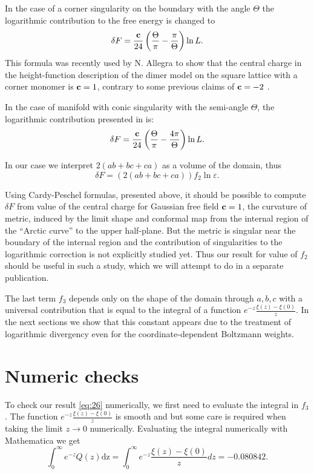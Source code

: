 \documentclass{article}
\newcommand{\dz}{\mathrm{dz}}
\begin{document}
In the case of a corner singularity on the boundary with the angle
$\Theta$ the logarithmic contribution to the free energy is changed to
\begin{equation}
  \label{eq:86}
  \delta F = \frac{{\bf c}}{24}\left(\frac{\Theta}{\pi}-\frac{\pi}{\Theta}\right) \ln L.
\end{equation}
This formula was recently used by N. Allegra \cite{allegra2015exact} to show that the central charge
in the height-function description of the dimer model on the square lattice with a corner monomer is
${\bf c}=1$, contrary to some previous claims of ${\bf c}=-2$ \cite{morin2016integrability}.

In the case of manifold with conic singularity with the semi-angle
$\Theta$, the logarithmic contribution presented in \cite{cardy1988finite} is:
\begin{equation}
  \label{eq:91}
  \delta F = \frac{{\bf c}}{24}\left(\frac{\Theta}{\pi}-\frac{4\pi}{\Theta}\right) \ln L.
\end{equation}


In our case we interpret $2(ab+bc+ca)$ as a volume of the domain, thus
\begin{equation}
  \label{eq:33}
  \delta F = \left(2(ab+bc+ca)\right) f_{2}\ln\varepsilon.
\end{equation}

Using Cardy-Peschel formulas, presented above, it should be possible to compute $\delta F$ from
value of the central charge for Gaussian free field ${\bf c}=1$, the curvature of metric, induced by
the limit shape and conformal map from the internal region of the ``Arctic curve'' to the upper
half-plane. But the metric is singular near the boundary of the internal region
\cite{kenyon2007limit} and the contribution of singularities to the logarithmic correction is not
explicitly studied yet. Thus our result for value of $f_2$ should be useful in such a study, which
we will attempt to do in a separate publication.

The last term $f_{3}$ depends only on the shape of the domain through
$a,b,c$ with a universal contribution that is equal to the integral of
a function $e^{-z}\frac{\xi(z)-\xi(0)}{z}$. In the next sections we
show that this constant appears due to the treatment of logarithmic
divergency even for the coordinate-dependent Boltzmann weights. 

\section{Numeric checks}
\label{sec:numeric-checks}
To check our result \eqref{eq:26} numerically, we first need to evaluate the integral in $f_{3}$.
The function $e^{-z}\frac{\xi(z)-\xi(0)}{z}$ is smooth and but some care is required when taking the
limit $z\to 0$ numerically. Evaluating the integral numerically with Mathematica we get
\begin{equation}
  \label{eq:2}
  \int_{0}^{\infty}e^{-z}Q(z)\dz=\int_{0}^{\infty}e^{-z}\frac{\xi(z)-\xi(0)}{z} dz = -0.080842.%
\end{equation}
\end{document}
